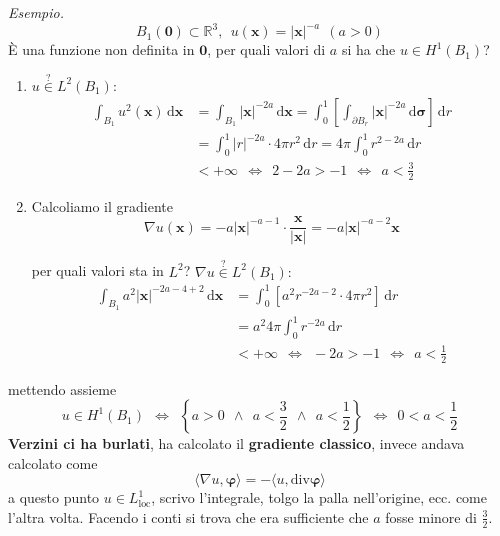 \documentclass[10pt,a4paper,twoside,openright]{book}
\newcommand{\x}{\mathbf{x}}
\newcommand{\zer}{\mathbf{0}}
\newcommand{\sigg}{\bm{\sigma}}
\newcommand{\de}{\,\mathrm d}
\newcommand{\dr}{\de r}
\newcommand{\dxx}{\de \x}
\newcommand{\dsig}{\de \sigg}
\begin{document}
\textit{Esempio.}
\begin{equation*}
    B_{1}(\zer) \subset \mathbb{R}^{3} ,\ \ u(\x) =| \x| ^{-a} \ \ (a >0)
\end{equation*}
È una funzione non definita in $\zer$, per quali valori di $a$ si ha che $u\in H^{1}(B_{1})$?
\begin{enumerate}
    \item $u\overset{?}{\in } L^{2}(B_{1}) :$
          \begin{align*}
              \int _{B_{1}} u^{2}(\x) \dxx & =\int _{B_{1}}| \x| ^{-2a} \dxx =\int ^{1}_{0}\left[\int _{\partial B_{r}}| \x| ^{-2a} \dsig \right] \dr \\
                                           & =\int ^{1}_{0}| r| ^{-2a} \cdotp 4\pi r^{2} \dr=4\pi \int ^{1}_{0} r^{2-2a} \dr                          \\
                                           & < +\infty \ \ \Leftrightarrow \ \ 2-2a >-1\ \ \Leftrightarrow \ \ a< \frac{3}{2}
          \end{align*}
    \item Calcoliamo il gradiente
          \begin{equation*}
              \nabla u(\x) =-a| \x| ^{-a-1} \cdotp \frac{\x}{| \x| } =-a| \x| ^{-a-2}\x
          \end{equation*}

          per quali valori sta in $L^{2}$? $\nabla u\overset{?}{\in } L^{2}(B_{1}) :$
          \begin{align*}
              \int _{B_{1}} a^{2}| \x| ^{-2a-4+2} \dxx & =\int ^{1}_{0}\left[ a^{2} r^{-2a-2} \cdotp 4\pi r^{2}\right] \dr               \\
                                                       & =a^{2} 4\pi \int ^{1}_{0} r^{-2a} \dr                                           \\
                                                       & < +\infty \ \ \Leftrightarrow \ \ -2a >-1\ \ \Leftrightarrow \ \ a< \frac{1}{2}
          \end{align*}
\end{enumerate}

mettendo assieme
\begin{equation*}
    u\in H^{1}(B_{1}) \ \ \Leftrightarrow \ \ \left\{a >0\ \ \land \ \ a< \frac{3}{2} \ \ \land \ \ a< \frac{1}{2}\right\} \ \ \Leftrightarrow \ \ 0< a< \frac{1}{2}
\end{equation*}
\textbf{Verzini ci ha burlati}, ha calcolato il \textbf{gradiente classico}, invece andava calcolato come
\begin{equation*}
    \langle \nabla u,\bm{\varphi} \rangle =-\langle u,\mathrm{div}\bm{\varphi} \rangle
\end{equation*}
a questo punto $u\in L^{1}_{\mathrm{loc}}$, scrivo l'integrale, tolgo la palla nell'origine, ecc. come l'altra volta. Facendo i conti si trova che era sufficiente che $a$ fosse minore di $\frac{3}{2}$.
\end{document}
